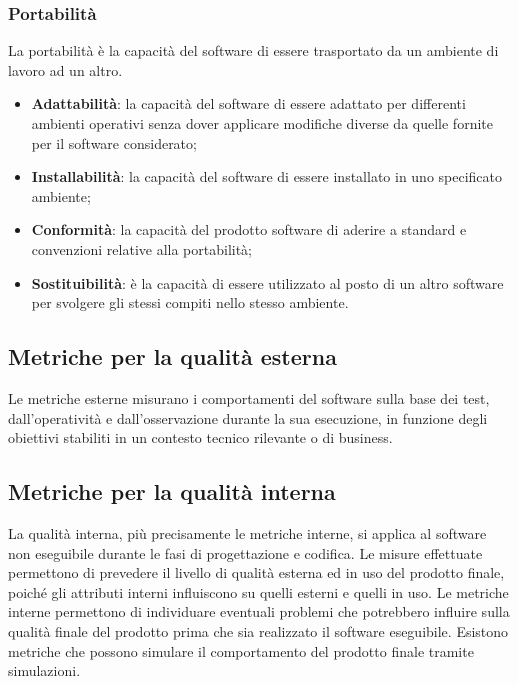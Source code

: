 \subsubsection{Portabilità}
La portabilità è la capacità del software di essere trasportato da un ambiente di lavoro ad un altro.
\begin{itemize}

    \item \textbf{Adattabilità}: la capacità del software di essere adattato per differenti ambienti operativi senza dover applicare modifiche diverse da quelle fornite per il software considerato;
    
    \item \textbf{Installabilità}: la capacità del software di essere installato in uno specificato ambiente;
    
    \item \textbf{Conformità}: la capacità del prodotto software di aderire a standard e convenzioni relative alla portabilità;
    
    \item \textbf{Sostituibilità}: è la capacità di essere utilizzato al posto di un altro software per svolgere gli stessi compiti nello stesso ambiente.
    
\end{itemize}

\subsection{Metriche per la qualità esterna}
Le metriche esterne misurano i comportamenti del software sulla base dei test, dall'operatività e dall'osservazione durante la sua esecuzione, in funzione degli obiettivi stabiliti in un contesto tecnico rilevante o di business.

\subsection{Metriche per la qualità interna}
La qualità interna, più precisamente le metriche interne, si applica al software non eseguibile durante le fasi di progettazione e codifica. Le misure effettuate permettono di prevedere il livello di qualità esterna ed in uso del prodotto finale, poiché gli attributi interni influiscono su quelli esterni e quelli in uso. Le metriche interne permettono di individuare eventuali problemi che potrebbero influire sulla qualità finale del prodotto prima che sia realizzato il software eseguibile. Esistono metriche che possono simulare il comportamento del prodotto finale tramite simulazioni.

